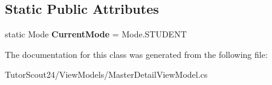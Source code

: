 \subsection*{Static Public Attributes}
\begin{DoxyCompactItemize}
\item 
\mbox{\label{class_tutor_scout24_1_1_view_models_1_1_master_detail_view_model_aa7ea4356bc623ff5b1ffb854b979319c}} 
static Mode {\bfseries Current\+Mode} = Mode.\+S\+T\+U\+D\+E\+NT
\end{DoxyCompactItemize}


The documentation for this class was generated from the following file\+:\begin{DoxyCompactItemize}
\item 
Tutor\+Scout24/\+View\+Models/Master\+Detail\+View\+Model.\+cs\end{DoxyCompactItemize}
